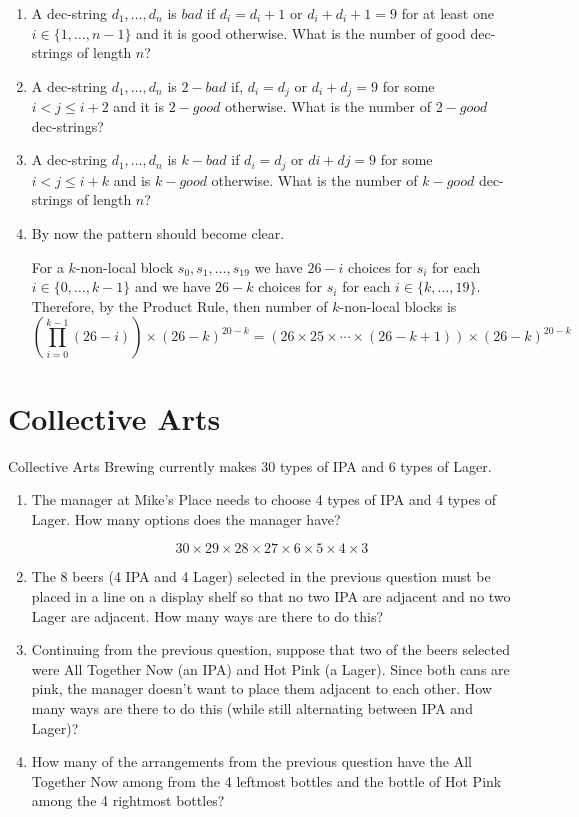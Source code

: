 \documentclass{article}
\begin{document}
\begin{enumerate}
   \item A dec-string $d_1,\ldots,d_n$ is $bad$ if $d_i=d_i+1$ or $d_i+d_i+1=9$ for at least one $i\in\{1,\ldots,n-1\}$ and it is good otherwise. What is the number of good dec-strings of length $n$?
   
   \item A dec-string $d_1,\ldots,d_n$ is $2-bad$ if, $d_i=d_j$ or $d_i+d_j=9$ for some $i<j \leq i+2$ and it is $2-good$ otherwise. What is the number of $2-good$ dec-strings?
   
   \item A dec-string $d_1,\ldots,d_n$ is $k-bad$ if $d_i=d_j$ or $di+dj=9$ for some $i<j \leq i+k$ and is $k-good$ otherwise. What is the number of $k-good$ dec-strings of length $n$?

  \item By now the pattern should become clear.  
  
  For a $k$-non-local block $s_0,s_1,\ldots,s_{19}$ we have $26-i$ choices for $s_i$ for each $i\in\{0,\ldots,k-1\}$ and we have $26-k$ choices for $s_i$ for each $i\in\{k,\ldots,19\}$.
  Therefore, by the Product Rule, then number of $k$-non-local blocks is 
  \[
     \left(\prod_{i=0}^{k-1}(26-i)\right)\times (26-k)^{20-k} =
     \left(26\times 25\times\cdots\times (26-k+1)\right)\times(26-k)^{20-k}
     \enspace
  \]
\end{enumerate}

\section{Collective Arts}

Collective Arts Brewing currently makes 30 types of IPA and 6 types of Lager.

\begin{enumerate}

   \item The manager at Mike's Place needs to choose 4 types of IPA and 4 types of Lager. How many options does the manager have?

   \[
     30\times 29\times 28\times 27\times 
     6\times 5\times 4\times 3
   \]
   
   \item The 8 beers (4 IPA and 4 Lager) selected in the previous question must be placed in a line on a display shelf so that no two IPA are adjacent and no two Lager are adjacent. How many ways are there to do this?

   \item Continuing from the previous question, suppose that two of the beers selected were All Together Now (an IPA) and Hot Pink (a Lager). Since both cans are pink, the manager doesn't want to place them adjacent to each other. How many ways are there to do this (while still alternating between IPA and Lager)?
   
   \item How many of the arrangements from the previous question have the All Together Now among from the 4 leftmost bottles and the bottle of Hot Pink among the 4 rightmost bottles?

\end{enumerate}
\end{document}
